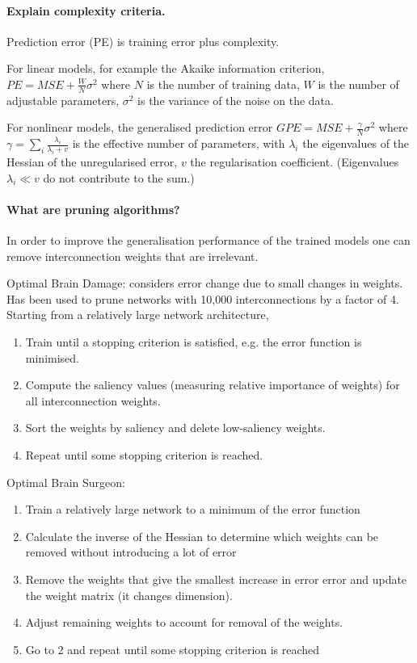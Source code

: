 \paragraph{Explain complexity criteria.}

Prediction error (PE) is training error plus complexity.

For linear models, for example the Akaike information criterion,
$PE = MSE + \frac{W}{N} \sigma^2$ where
$N$ is the number of training data,
$W$ is the number of adjustable parameters,
$\sigma^2$ is the variance of the noise on the data.

For nonlinear models, the generalised prediction error
$GPE = MSE + \frac{\gamma}{N} \sigma^2$ where
$\gamma = \sum_i{\frac{\lambda_i}{\lambda_i + v}}$ is the effective number of parameters,
with $\lambda_i$ the eigenvalues of the Hessian of the unregularised error,
$v$ the regularisation coefficient.
(Eigenvalues $\lambda_i \ll v$ do not contribute to the sum.)

\paragraph{What are pruning algorithms?}

In order to improve the generalisation performance of the trained models one can
remove interconnection weights that are irrelevant.

\noindent Optimal Brain Damage: considers error change due to small changes in weights.
Has been used to prune networks with 10,000 interconnections by a factor of 4.
Starting from a relatively large network architecture,

\begin{enumerate}
    \item Train until a stopping criterion is satisfied, e.g. the error function is minimised.
    \item Compute the saliency values (measuring relative importance of weights) for all interconnection weights.
    \item Sort the weights by saliency and delete low-saliency weights.
    \item Repeat until some stopping criterion is reached.
\end{enumerate}

\noindent Optimal Brain Surgeon:

\begin{enumerate}
    \item Train a relatively large network to a minimum of the error function
    \item Calculate the inverse of the Hessian to determine which weights can be removed without introducing a lot of error
    \item Remove the weights that give the smallest increase in error error and update the weight matrix (it changes dimension).
    \item Adjust remaining weights to account for removal of the weights.
    \item Go to 2 and repeat until some stopping criterion is reached
\end{enumerate}


